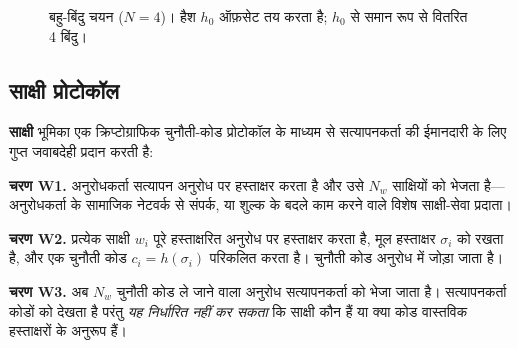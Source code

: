 \documentclass[11pt,a4paper,twocolumn]{article}
\begin{document}
\begin{figure}[ht]
\centering
{}
\caption{बहु-बिंदु चयन ($N{=}4$)। हैश $h_0$ ऑफ़सेट तय करता है; $h_0$ से समान रूप से वितरित 4 बिंदु।}
\label{fig:multipoint}
\end{figure}

\subsection{साक्षी प्रोटोकॉल}

\textbf{साक्षी} भूमिका एक क्रिप्टोग्राफिक चुनौती-कोड प्रोटोकॉल के माध्यम से सत्यापनकर्ता की ईमानदारी के लिए गुप्त जवाबदेही प्रदान करती है:

\textbf{चरण W1.} अनुरोधकर्ता सत्यापन अनुरोध पर हस्ताक्षर करता है और उसे $N_w$ साक्षियों को भेजता है---अनुरोधकर्ता के सामाजिक नेटवर्क से संपर्क, या शुल्क के बदले काम करने वाले विशेष साक्षी-सेवा प्रदाता।

\textbf{चरण W2.} प्रत्येक साक्षी $w_i$ पूरे हस्ताक्षरित अनुरोध पर हस्ताक्षर करता है, मूल हस्ताक्षर $\sigma_i$ को रखता है, और एक चुनौती कोड $c_i = h(\sigma_i)$ परिकलित करता है। चुनौती कोड अनुरोध में जोड़ा जाता है।

\textbf{चरण W3.} अब $N_w$ चुनौती कोड ले जाने वाला अनुरोध सत्यापनकर्ता को भेजा जाता है। सत्यापनकर्ता कोडों को देखता है परंतु \emph{यह निर्धारित नहीं कर सकता} कि साक्षी कौन हैं या क्या कोड वास्तविक हस्ताक्षरों के अनुरूप हैं।
\end{document}
